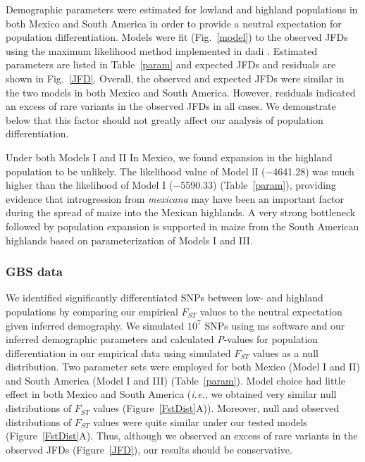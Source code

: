 Demographic parameters were estimated for lowland and highland populations in both Mexico and South America in order to provide a neutral expectation for population differentiation.  
Models were fit (Fig.~\ref{model}) to the observed JFDs using the maximum likelihood method implemented in {\sf dadi} \cite[]{Gutenkunst_2009_19851460}.  
Estimated parameters are listed in Table~\ref{param} and expected JFDs and residuals are shown in Fig.~\ref{JFD}.  
Overall, the observed and expected JFDs were similar in the two models in both Mexico and South America.
However, residuals indicated an excess of rare variants in the observed JFDs in all cases.  We demonstrate below that this factor should not greatly affect our analysis of population differentiation.

Under both Models I and II In Mexico, we found expansion in the highland population to be unlikely.  
The likelihood value of Model lI ($-$4641.28) was much higher than the likelihood of Model I ($-$5590.33) (Table~\ref{param}), providing evidence that introgression from \emph{mexicana} may have been an important factor during the spread of maize into the Mexican highlands. %
A very strong bottleneck followed by population expansion is supported in maize from the South American highlands based on parameterization of Models I and III.  

\subsubsection{GBS data}We identified significantly differentiated SNPs between low- and highland populations by comparing our empirical $F_{ST}$ values to the neutral expectation given inferred demography.
We simulated $10^7$ SNPs using {\sf ms} software \cite[]{Hudson_2002_11847089} and our inferred demographic parameters and calculated \emph{P}-values for population differentiation in our empirical data using simulated $F_{ST}$ values as a null distribution.  
Two parameter sets were employed for both Mexico (Model I and II) and South America (Model I and III) (Table~\ref{param}).
Model choice had little effect in both Mexico and South America (\emph{i.e.,} we obtained very similar null distributions of $F_{ST}$ values (Figure~\ref{FstDist}A)).
Moreover, null and observed distributions of $F_{ST}$ values were quite similar under our tested models (Figure~\ref{FstDist}A).
Thus, although we observed an excess of rare variants in the observed JFDs (Figure~\ref{JFD}), our results should be conservative.

